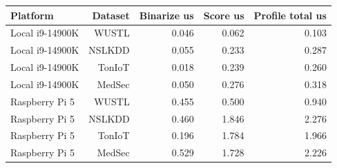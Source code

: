\begin{tabular}{lrrrr}
\toprule
Platform & Dataset & Binarize us & Score us & Profile total us \\
\midrule
Local i9-14900K & WUSTL & 0.046 & 0.062 & 0.103 \\
Local i9-14900K & NSLKDD & 0.055 & 0.233 & 0.287 \\
Local i9-14900K & TonIoT & 0.018 & 0.239 & 0.260 \\
Local i9-14900K & MedSec & 0.050 & 0.276 & 0.318 \\
Raspberry Pi 5 & WUSTL & 0.455 & 0.500 & 0.940 \\
Raspberry Pi 5 & NSLKDD & 0.460 & 1.846 & 2.276 \\
Raspberry Pi 5 & TonIoT & 0.196 & 1.784 & 1.966 \\
Raspberry Pi 5 & MedSec & 0.529 & 1.728 & 2.226 \\
\bottomrule
\end{tabular}
